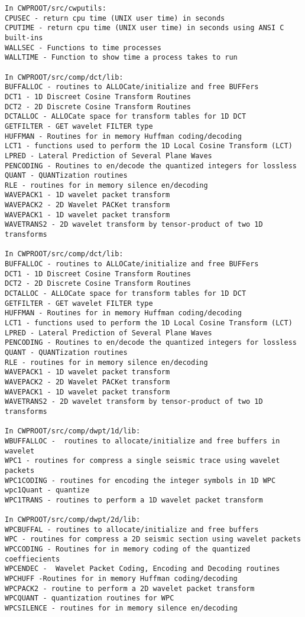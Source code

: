 {\begin{verbatim}
In CWPROOT/src/cwputils:
CPUSEC - return cpu time (UNIX user time) in seconds
CPUTIME - return cpu time (UNIX user time) in seconds using ANSI C built-ins
WALLSEC - Functions to time processes
WALLTIME - Function to show time a process takes to run

In CWPROOT/src/comp/dct/lib:
BUFFALLOC - routines to ALLOCate/initialize and free BUFFers
DCT1 - 1D Discreet Cosine Transform Routines
DCT2 - 2D Discrete Cosine Transform Routines
DCTALLOC - ALLOCate space for transform tables for 1D DCT
GETFILTER - GET wavelet FILTER type
HUFFMAN - Routines for in memory Huffman coding/decoding
LCT1 - functions used to perform the 1D Local Cosine Transform (LCT)
LPRED - Lateral Prediction of Several Plane Waves
PENCODING - Routines to en/decode the quantized integers for lossless 
QUANT - QUANTization routines
RLE - routines for in memory silence en/decoding
WAVEPACK1 - 1D wavelet packet transform
WAVEPACK2 - 2D Wavelet PACKet transform 
WAVEPACK1 - 1D wavelet packet transform
WAVETRANS2 - 2D wavelet transform by tensor-product of two 1D transforms

In CWPROOT/src/comp/dct/lib:
BUFFALLOC - routines to ALLOCate/initialize and free BUFFers
DCT1 - 1D Discreet Cosine Transform Routines
DCT2 - 2D Discrete Cosine Transform Routines
DCTALLOC - ALLOCate space for transform tables for 1D DCT
GETFILTER - GET wavelet FILTER type
HUFFMAN - Routines for in memory Huffman coding/decoding
LCT1 - functions used to perform the 1D Local Cosine Transform (LCT)
LPRED - Lateral Prediction of Several Plane Waves
PENCODING - Routines to en/decode the quantized integers for lossless 
QUANT - QUANTization routines
RLE - routines for in memory silence en/decoding
WAVEPACK1 - 1D wavelet packet transform
WAVEPACK2 - 2D Wavelet PACKet transform 
WAVEPACK1 - 1D wavelet packet transform
WAVETRANS2 - 2D wavelet transform by tensor-product of two 1D transforms

In CWPROOT/src/comp/dwpt/1d/lib:
WBUFFALLOC -  routines to allocate/initialize and free buffers in wavelet
WPC1 - routines for compress a single seismic trace using wavelet packets 
WPC1CODING - routines for encoding the integer symbols in 1D WPC 
wpc1Quant - quantize
WPC1TRANS - routines to perform a 1D wavelet packet transform 

In CWPROOT/src/comp/dwpt/2d/lib:
WPCBUFFAL - routines to allocate/initialize and free buffers
WPC - routines for compress a 2D seismic section using wavelet packets 
WPCCODING - Routines for in memory coding of the quantized coeffiecients
WPCENDEC -  Wavelet Packet Coding, Encoding and Decoding routines
WPCHUFF -Routines for in memory Huffman coding/decoding
WPCPACK2 - routine to perform a 2D wavelet packet transform 
WPCQUANT - quantization routines for WPC
WPCSILENCE - routines for in memory silence en/decoding


\end{verbatim}}
